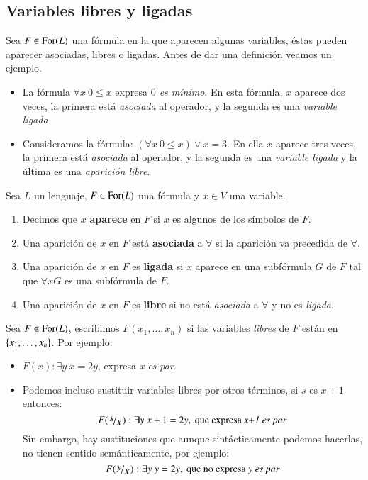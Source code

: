 \subsection{Variables libres y ligadas}
Sea $F \in \mathrm{For}(L)$ una fórmula en la que aparecen algunas variables, éstas pueden aparecer asociadas, libres o ligadas. Antes de dar una definición veamos un ejemplo.

\begin{eg}
    \begin{itemize}
        \item La fórmula $\forall x\ 0\leq x$ expresa \textit{$0$ es mínimo}. En esta fórmula, $x$ aparece dos veces, la primera está \textit{asociada} al operador, y la segunda es una \textit{variable ligada}
        \item Consideramos la fórmula: $(\forall x\ 0\leq x) \lor x = 3$. En ella $x$ aparece tres veces, la primera está \textit{asociada} al operador, y la segunda es una \textit{variable ligada} y la última es una \textit{aparición libre}.
    \end{itemize}
\end{eg}

\begin{dfn}
    Sea $L$ un lenguaje, $F \in \mathrm{For}(L)$ una fórmula y $x\in V$ una variable.
    \begin{enumerate}
        \item Decimos que $x$ \textbf{aparece} en $F$ si $x$ es algunos de los símbolos de $F$.
        \item Una aparición de $x$ en $F$ está \textbf{asociada} a $\forall$ si la aparición va precedida de $\forall$.
        \item Una aparición de $x$ en $F$ es \textbf{ligada} si $x$ aparece en una subfórmula $G$ de $F$ tal que $\forall x G$ es una subfórmula de $F$.
        \item Una aparición de $x$ en $F$ es \textbf{libre} si no está \textit{asociada} a $\forall$ y no es \textit{ligada}.
    \end{enumerate}
\end{dfn}

\begin{obs}[Notación]
    Sea $F \in \mathrm{For}(L)$, escribimos $F(x_1, \ldots, x_n)$ si las variables \textit{libres} de $F$ están en $\left\{x_1, \ldots, x_n\right\}$. Por ejemplo:
    \begin{itemize}
        \item $F(x): \exists y\ x = 2y$, expresa \textit{x es par}.
        \item Podemos incluso sustituir variables libres por otros términos, si $s$ es $x+1$ entonces:
        $$
            F(\quo{s}{x}): \exists y\ x+1=2y, \text{ que expresa \textit{x+1 es par}}
        $$
        Sin embargo, hay sustituciones que aunque sintácticamente podemos hacerlas, no tienen sentido semánticamente, por ejemplo:
        $$
            F(\quo{y}{x}): \exists y\ y=2y, \text{ que no expresa \textit{y es par}}
        $$
    \end{itemize}
\end{obs}


